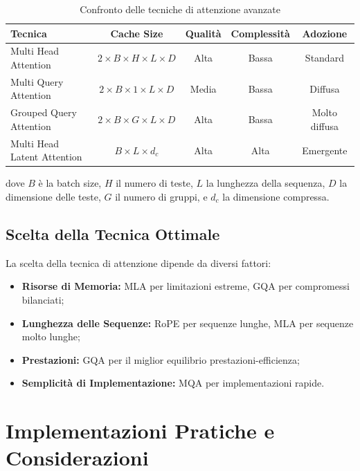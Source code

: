 \begin{table}[htbp]
    \centering
    \begin{adjustbox}{width=\textwidth}
    \begin{tabular}{|l|c|c|c|c|}
    \hline
    \textbf{Tecnica} & \textbf{Cache Size} & \textbf{Qualità} & \textbf{Complessità} & \textbf{Adozione} \\
    \hline
    Multi Head Attention & $2 \times B \times H \times L \times D$ & Alta & Bassa & Standard \\
    Multi Query Attention & $2 \times B \times 1 \times L \times D$ & Media & Bassa & Diffusa \\
    Grouped Query Attention & $2 \times B \times G \times L \times D$ & Alta & Bassa & Molto diffusa \\
    Multi Head Latent Attention & $B \times L \times d_c$ & Alta & Alta & Emergente \\
    \hline
    \end{tabular}
    \end{adjustbox}
    \caption{Confronto delle tecniche di attenzione avanzate}
    \label{tab:attention_comparison}
\end{table}

dove $B$ è la batch size, $H$ il numero di teste, $L$ la lunghezza della sequenza, $D$ la dimensione delle teste, $G$ il numero di gruppi, e $d_c$ la dimensione compressa.

\subsection{Scelta della Tecnica Ottimale}
La scelta della tecnica di attenzione dipende da diversi fattori:

\begin{itemize}
    \item \textbf{Risorse di Memoria:} MLA per limitazioni estreme, GQA per compromessi bilanciati;
    \item \textbf{Lunghezza delle Sequenze:} RoPE per sequenze lunghe, MLA per sequenze molto lunghe;
    \item \textbf{Prestazioni:} GQA per il miglior equilibrio prestazioni-efficienza;
    \item \textbf{Semplicità di Implementazione:} MQA per implementazioni rapide.
\end{itemize}

\section{Implementazioni Pratiche e Considerazioni}

